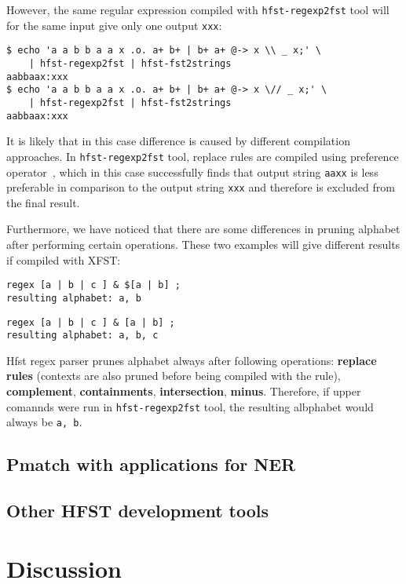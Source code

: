 \documentclass{llncs}
\begin{document}
However, the same regular expression compiled with \verb+hfst-regexp2fst+ tool
will for the same input give only one output \verb+xxx+:
\begin{verbatim}
$ echo 'a a b b a a x .o. a+ b+ | b+ a+ @-> x \\ _ x;' \
    | hfst-regexp2fst | hfst-fst2strings
aabbaax:xxx
$ echo 'a a b b a a x .o. a+ b+ | b+ a+ @-> x \// _ x;' \
    | hfst-regexp2fst | hfst-fst2strings
aabbaax:xxx
\end{verbatim} 
It is likely that in this case difference is caused by different compilation approaches.
In \verb+hfst-regexp2fst+ tool, replace rules are compiled using preference
operator~\cite{drobac/2012}, which in this case successfully finds that output string
\verb+aaxx+ is less preferable in comparison to the output string \verb+xxx+ and therefore is excluded from the final result.

Furthermore, we have noticed that there are some differences in pruning alphabet
after performing certain operations.
These two examples will give different results if compiled with XFST:  
\begin{verbatim}
regex [a | b | c ] & $[a | b] ;
resulting alphabet: a, b
\end{verbatim}
\begin{verbatim}
regex [a | b | c ] & [a | b] ;
resulting alphabet: a, b, c
\end{verbatim}

Hfst regex parser prunes alphabet always after following operations:
\textbf{replace rules} (contexts are also pruned before being compiled with the
rule), \textbf{complement}, \textbf{containments}, \textbf{intersection},
\textbf{minus}.
Therefore, if upper comannds were run in \verb+hfst-regexp2fst+ tool, the
resulting albphabet would always be \verb+a, b+.

\subsection{Pmatch with applications for NER}

\subsection{Other HFST development tools}

\section{Discussion}\label{hfst:discussion}
\end{document}
